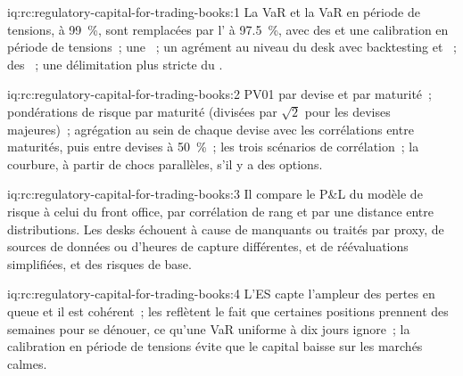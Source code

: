 \begin{solution}{iq:rc:regulatory-capital-for-trading-books:1}
La VaR et la VaR en période de tensions, à 99~\%, sont remplacées par l' à 97.5~\%, avec des  et une
calibration en période de tensions~; une ~; un agrément au niveau du desk avec backtesting et
~; des ~; une délimitation plus stricte du .
\end{solution}

\begin{solution}{iq:rc:regulatory-capital-for-trading-books:2}
PV01 par devise et par maturité~; pondérations de risque par maturité (divisées par $\sqrt2$ pour les devises majeures)~;
agrégation au sein de chaque devise avec les corrélations entre maturités, puis entre devises à 50~\%~; les trois
scénarios de corrélation~; la courbure, à partir de chocs parallèles, s'il y a des options.
\end{solution}

\begin{solution}{iq:rc:regulatory-capital-for-trading-books:3}
Il compare le P\&L du modèle de risque à celui du front office, par corrélation de rang et par une
distance entre distributions. Les desks échouent à cause de  manquants ou traités par proxy, de sources de données ou d'heures de capture différentes,
et de réévaluations simplifiées, et des risques de base.
\end{solution}

\begin{solution}{iq:rc:regulatory-capital-for-trading-books:4}
L'ES capte l'ampleur des pertes en queue et il est cohérent~; les  reflètent le fait que certaines positions prennent
des semaines pour se dénouer, ce qu'une VaR uniforme à dix jours ignore~; la calibration en période de tensions évite que le capital baisse
sur les marchés calmes.
\end{solution}

